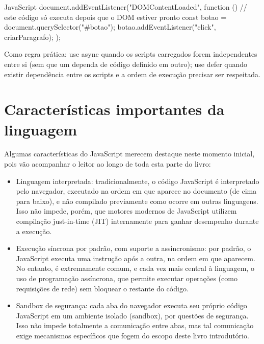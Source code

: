 \begin{codebox}{JavaScript}
document.addEventListener("DOMContentLoaded", function () {
  // este código só executa depois que o DOM estiver pronto
  const botao = document.querySelector("#botao");
  botao.addEventListener("click", criarParagrafo);
});
\end{codebox}

Como regra prática: use async quando os scripts carregados forem independentes entre si (sem que um dependa de código definido em outro); use defer quando existir dependência entre os scripts e a ordem de execução precisar ser respeitada.

\section{Características importantes da linguagem}

Algumas características do JavaScript merecem destaque neste momento inicial, pois vão acompanhar o leitor ao longo de toda esta parte do livro:

\begin{itemize}
  \item Linguagem interpretada: tradicionalmente, o código JavaScript é interpretado pelo navegador, executado na ordem em que aparece no documento (de cima para baixo), e não compilado previamente como ocorre em outras linguagens. Isso não impede, porém, que motores modernos de JavaScript utilizem compilação just-in-time (JIT) internamente para ganhar desempenho durante a execução.
\end{itemize}

\begin{itemize}
  \item Execução síncrona por padrão, com suporte a assincronismo: por padrão, o JavaScript executa uma instrução após a outra, na ordem em que aparecem. No entanto, é extremamente comum, e cada vez mais central à linguagem, o uso de programação assíncrona, que permite executar operações (como requisições de rede) sem bloquear o restante do código.
\end{itemize}

\begin{itemize}
  \item Sandbox de segurança: cada aba do navegador executa seu próprio código JavaScript em um ambiente isolado (sandbox), por questões de segurança. Isso não impede totalmente a comunicação entre abas, mas tal comunicação exige mecanismos específicos que fogem do escopo deste livro introdutório.
\end{itemize}

